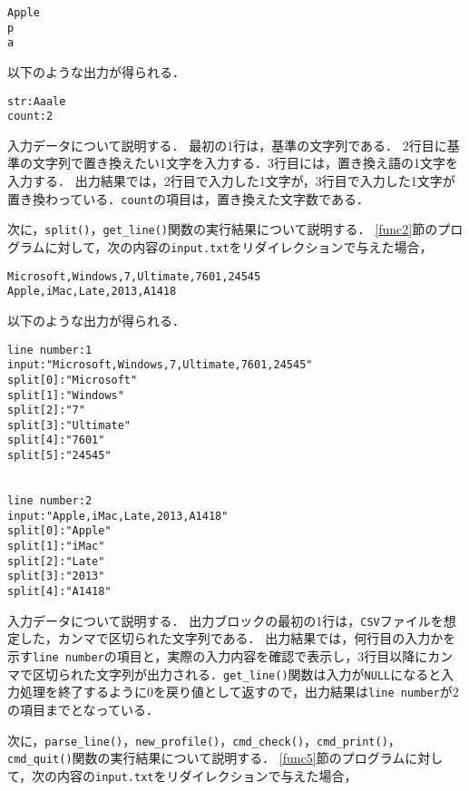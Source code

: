 {\fontsize{10pt}{11pt} \selectfont
 \begin{verbatim}
Apple
p
a
 \end{verbatim}
}

\noindent %
以下のような出力が得られる．

{\fontsize{10pt}{11pt} \selectfont
 \begin{verbatim}
str:Aaale
count:2
 \end{verbatim}
}

入力データについて説明する．
最初の1行は，基準の文字列である．
2行目に基準の文字列で置き換えたい1文字を入力する．3行目には，置き換え語の1文字を入力する．
出力結果では，2行目で入力した1文字が，3行目で入力した1文字が置き換わっている．\verb|count|の項目は，置き換えた文字数である．

次に，\verb|split()|，\verb|get_line()|関数の実行結果について説明する．
\ref{func2}節のプログラムに対して，次の内容の\verb|input.txt|をリダイレクションで与えた場合，

{\fontsize{10pt}{11pt} \selectfont
 \begin{verbatim}
Microsoft,Windows,7,Ultimate,7601,24545
Apple,iMac,Late,2013,A1418
 \end{verbatim}
}

\noindent %
以下のような出力が得られる．

{\fontsize{10pt}{11pt} \selectfont
 \begin{verbatim}
line number:1
input:"Microsoft,Windows,7,Ultimate,7601,24545"
split[0]:"Microsoft"
split[1]:"Windows"
split[2]:"7"
split[3]:"Ultimate"
split[4]:"7601"
split[5]:"24545"


line number:2
input:"Apple,iMac,Late,2013,A1418"
split[0]:"Apple"
split[1]:"iMac"
split[2]:"Late"
split[3]:"2013"
split[4]:"A1418"
 \end{verbatim}
}

入力データについて説明する．
出力ブロックの最初の1行は，\verb|CSV|ファイルを想定した，カンマで区切られた文字列である．
出力結果では，何行目の入力かを示す\verb|line number|の項目と，実際の入力内容を確認で表示し，3行目以降にカンマで区切られた文字列が出力される．\verb|get_line()|関数は入力が\verb|NULL|になると入力処理を終了するように$0$を戻り値として返すので，出力結果は\verb|line number|が$2$の項目までとなっている．

次に，\verb|parse_line()|，\verb|new_profile()|，\verb|cmd_check()|，\verb|cmd_print()|，\verb|cmd_quit()|関数の実行結果について説明する．
\ref{func5}節のプログラムに対して，次の内容の\verb|input.txt|をリダイレクションで与えた場合，

